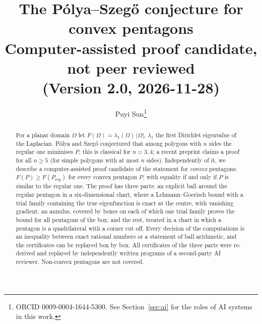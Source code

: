 \documentclass[11pt]{article}
\title{The P\'olya--Szeg\H{o} conjecture for convex pentagons\\[4pt]
\large Computer-assisted proof candidate, not peer reviewed\\
(Version 2.0, 2026-11-28)}
\author{Puyi Sun\thanks{ORCID 0009-0004-1644-5300. See Section~\ref{sec:ai} for the roles of AI systems in this work.}}
\date{}
\theoremstyle{remark}
\begin{document}
\maketitle

\begin{abstract}
For a planar domain $\Omega$ let $F(\Omega)=\lambda_1(\Omega)\,|\Omega|$, $\lambda_1$ the first Dirichlet eigenvalue of the
Laplacian. P\'olya and Szeg\H{o} conjectured that among polygons with $n$ sides the regular one minimises $F$; this is
classical for $n=3,4$; a recent preprint \cite{wang} claims a proof for all $n\ge5$ (for simple polygons with at most $n$
sides). Independently of it, we describe a computer-assisted proof candidate of the statement for \emph{convex}
pentagons: $F(P)\ge F(P_{\mathrm{reg}})$ for every convex pentagon $P$, with equality if and only if $P$ is similar to the regular
one. The proof has three parts: an explicit ball around the regular pentagon in a six-dimensional chart, where a
Lehmann--Goerisch bound with a trial family containing the true eigenfunction is exact at the centre, with vanishing
gradient; an annulus,
covered by boxes on each of which one trial family proves the bound for all pentagons of the box; and the rest, treated
in a chart in which a pentagon is a quadrilateral with a corner cut off. Every decision of the computations is an
inequality between exact rational numbers or a statement of ball arithmetic, and the certificates can be replayed box
by box. All certificates of the three parts were re-derived and replayed by independently written programs of a
second-party AI reviewer. Non-convex pentagons are not covered.
\end{abstract}
\end{document}
